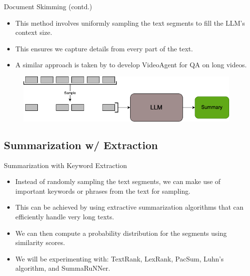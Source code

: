 \begin{frame}{Document Skimming (contd.)}

	\begin{itemize}
		\item This method involves uniformly sampling the text segments to fill the LLM's
		context size.
		\item This ensures we capture details from every part of the text.
		\item A similar approach is taken by \citet{wang2024videoagent} to develop
		VideoAgent for QA on long videos.
	\end{itemize}

	\vskip 1cm

	\begin{figure}
		\centering
		\includegraphics[width=1\textwidth]{Images/doc-skim.png}
	\end{figure}

\end{frame}


\subsection{Summarization w/ Extraction}

\begin{frame}{Summarization with Keyword Extraction}

	\begin{itemize}
		\item Instead of randomly sampling the text segments, we can make use of important
		keywords or phrases from the text for sampling.
		\item This can be achieved by using extractive summarization algorithms that can
		efficiently handle very long texts.
		\item We can then compute a probability distribution for the segments using
		similarity scores.
		\item We will be experimenting with: TextRank, LexRank, PacSum, Luhn's algorithm,
		and SummaRuNNer.
	\end{itemize}

\end{frame}


